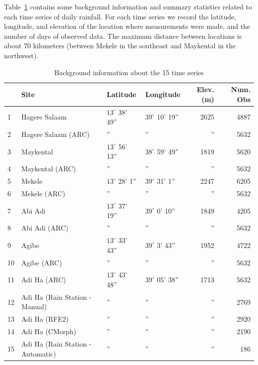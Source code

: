 \documentclass[12pt]{article}
\begin{document}
Table~\ref{tab_summary} contains some background information and summary statistics related to each time series of daily rainfall. For each time series we record the latitude, longitude, and elevation of the location where measurements were made, and the number of days of observed data. The maximum distance between locations is about 70 kilometers (between Mekele in the southeast and Maykental in the northwest).
\begin{table}[htdp]
\caption{Background information about the 15 time series}
\begin{center}
\begin{tabular}{|l|l|l|l|r|r|}
\hline
 & Site & Latitude & Longitude & Elev. (m) & Num. Obs \\
\hline
1 & Hagere Salaam & $13^\circ$ 38' 49'' & $39^\circ$ 10' 19'' & 2625 & 4887 \\
2 & Hagere Salaam (ARC) & '' & '' & '' & 5632 \\
3 & Maykental & $13^\circ$ 56' 13'' & $38^\circ$ 59' 49'' & 1819 & 5620 \\
4 & Maykental (ARC) & '' & '' & '' & 5632 \\
5 & Mekele & $13^\circ$ 28' 1'' & $39^\circ$ 31' 1'' & 2247 & 6205 \\
6 & Mekele (ARC) & '' & '' & '' & 5632 \\
7 & Abi Adi & $13^\circ$ 37' 19'' & $39^\circ$ 0' 10'' & 1849 & 4205 \\
8 & Abi Adi (ARC) & '' & '' & '' & 5632 \\
9 & Agibe & $13^\circ$ 33' 43'' & $39^\circ$ 3' 43'' & 1952 & 4722 \\
10 & Agibe (ARC) & '' & '' & '' & 5632 \\
11 & Adi Ha (ARC) & $13^\circ$ 43' 48'' & $39^\circ$ 05' 38'' & 1713 & 5632 \\
12 & Adi Ha (Rain Station - Manual) & '' & '' & '' & 2769 \\
13 & Adi Ha (RFE2) & '' & '' & '' & 2920 \\
14 & Adi Ha (CMorph) & '' & '' & '' & 2190 \\
15 & Adi Ha (Rain Station - Automatic) & '' & '' & '' & 186 \\
\hline
\end{tabular}
\end{center}
\label{tab_summary}
\end{table}%
\end{document}
